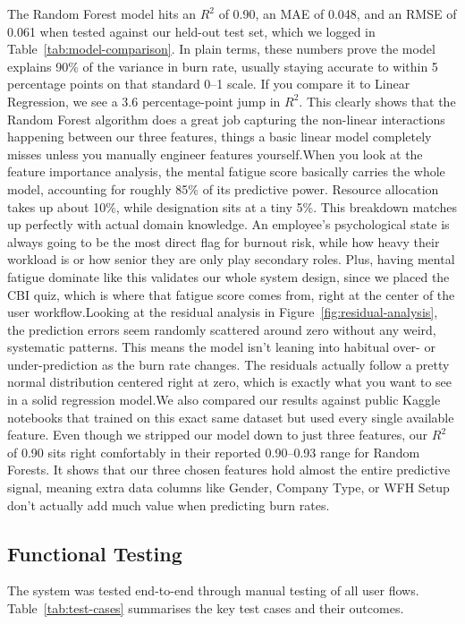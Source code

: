 \documentclass[12pt,a4paper]{article}
\begin{document}
The Random Forest model hits an $R^{2}$ of 0.90, an MAE of 0.048, and an RMSE of 0.061 when tested against our held-out test set, which we logged in Table~\ref{tab:model-comparison}. In plain terms, these numbers prove the model explains 90\% of the variance in burn rate, usually staying accurate to within 5 percentage points on that standard 0--1 scale. If you compare it to Linear Regression, we see a 3.6 percentage-point jump in $R^{2}$. This clearly shows that the Random Forest algorithm does a great job capturing the non-linear interactions happening between our three features, things a basic linear model completely misses unless you manually engineer features yourself.When you look at the feature importance analysis, the mental fatigue score basically carries the whole model, accounting for roughly 85\% of its predictive power. Resource allocation takes up about 10\%, while designation sits at a tiny 5\%. This breakdown matches up perfectly with actual domain knowledge. An employee's psychological state is always going to be the most direct flag for burnout risk, while how heavy their workload is or how senior they are only play secondary roles. Plus, having mental fatigue dominate like this validates our whole system design, since we placed the CBI quiz, which is where that fatigue score comes from, right at the center of the user workflow.Looking at the residual analysis in Figure~\ref{fig:residual-analysis}, the prediction errors seem randomly scattered around zero without any weird, systematic patterns. This means the model isn't leaning into habitual over- or under-prediction as the burn rate changes. The residuals actually follow a pretty normal distribution centered right at zero, which is exactly what you want to see in a solid regression model.We also compared our results against public Kaggle notebooks that trained on this exact same dataset but used every single available feature. Even though we stripped our model down to just three features, our $R^{2}$ of 0.90 sits right comfortably in their reported 0.90--0.93 range for Random Forests. It shows that our three chosen features hold almost the entire predictive signal, meaning extra data columns like Gender, Company Type, or WFH Setup don't actually add much value when predicting burn rates.

\subsection{Functional Testing}

The system was tested end-to-end through manual testing of all user flows.
Table~\ref{tab:test-cases} summarises the key test cases and their
outcomes.
\end{document}
